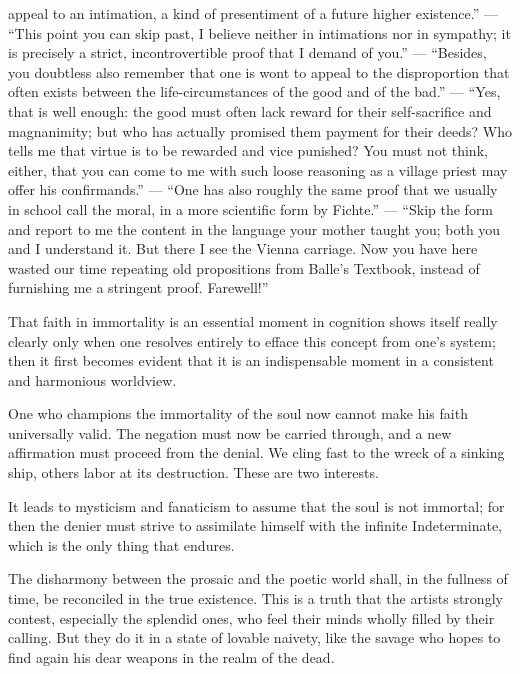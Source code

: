 \documentclass[12pt,a4paper]{article}
\newcommand{\opage}[1]{\marginnote{\footnotesize\textit{[#1]}}}
\newcommand{\aphsep}{\par\smallskip\centerline{\textasteriskcentered}\smallskip}
\begin{document}
appeal to an intimation, a kind of presentiment of a future higher existence.''
--- ``This point you can skip past, I believe neither in intimations nor in
sympathy; it is precisely a strict, incontrovertible proof that I demand of you.''
--- ``Besides, you doubtless also remember that one is wont to appeal to the
disproportion that often exists between the life-circumstances of the good and of
the bad.'' --- ``Yes, that is well enough: the good must often lack reward for
their self-sacrifice and magnanimity; but who has actually promised them payment
for their deeds? Who tells me that virtue is to be rewarded and vice punished? You
must not think, either, that you can come to me with such loose reasoning as a
village priest may offer his confirmands.'' --- ``One has also roughly the same
proof that we usually in school call the moral, in a more scientific form by
Fichte.'' --- ``Skip the form and report to me the content in the language your
mother taught you; both you and I understand it. But there I see the Vienna
carriage. Now you have here wasted our time repeating old propositions from
Balle's Textbook, instead of furnishing me a stringent proof. Farewell!''

\aphsep

That faith in immortality is an essential moment in cognition shows itself really
clearly only when one resolves entirely \opage{48}to efface this concept from
one's system; then it first becomes evident that it is an indispensable moment in
a consistent and harmonious worldview.

\aphsep

One who champions the immortality of the soul now cannot make his faith
universally valid. The negation must now be carried through, and a new affirmation
must proceed from the denial. We cling fast to the wreck of a sinking ship, others
labor at its destruction. These are two interests.

\aphsep

It leads to mysticism and fanaticism to assume that the soul is not immortal; for
then the denier must strive to assimilate himself with the infinite Indeterminate,
which is the only thing that endures.

\aphsep

The disharmony between the prosaic and the poetic world shall, in the fullness of
time, be reconciled in the true existence. This is a truth that the artists
strongly contest, especially the splendid ones, who feel their minds wholly filled
by their calling. But they do it in a state of lovable naivety, like the savage
who hopes to find again his dear weapons in the realm of the dead.
\end{document}

